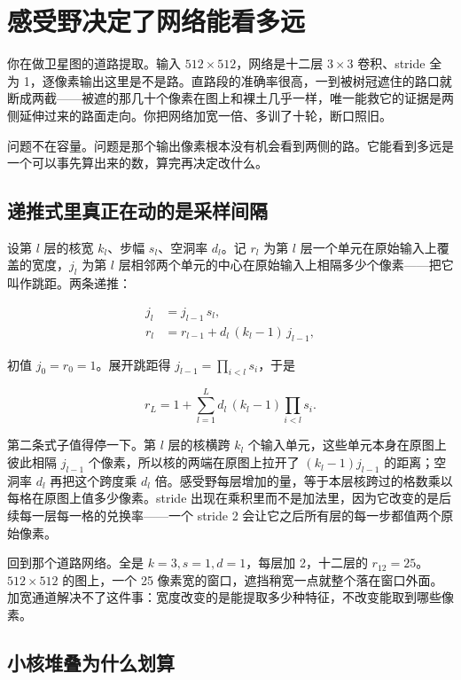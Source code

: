 \section{感受野决定了网络能看多远}
\label{sec:14-Deep-Learning/04-Convolutional-Networks/02}

你在做卫星图的道路提取。输入 \(512\times512\)，网络是十二层 \(3\times3\) 卷积、stride 全为 1，逐像素输出这里是不是路。直路段的准确率很高，一到被树冠遮住的路口就断成两截——被遮的那几十个像素在图上和裸土几乎一样，唯一能救它的证据是两侧延伸过来的路面走向。你把网络加宽一倍、多训了十轮，断口照旧。

问题不在容量。问题是那个输出像素根本没有机会看到两侧的路。它能看到多远是一个可以事先算出来的数，算完再决定改什么。

\subsection{递推式里真正在动的是采样间隔}

设第 \(l\) 层的核宽 \(k_l\)、步幅 \(s_l\)、空洞率 \(d_l\)。记 \(r_l\) 为第 \(l\) 层一个单元在原始输入上覆盖的宽度，\(j_l\) 为第 \(l\) 层相邻两个单元的中心在原始输入上相隔多少个像素——把它叫作跳距。两条递推：

\[
\begin{aligned}
j_l &= j_{l-1}\,s_l,\\
r_l &= r_{l-1} + d_l\,(k_l-1)\,j_{l-1},
\end{aligned}
\]

初值 \(j_0=r_0=1\)。展开跳距得 \(j_{l-1}=\prod_{i<l}s_i\)，于是

\[
r_L = 1 + \sum_{l=1}^{L} d_l\,(k_l-1)\prod_{i<l}s_i .
\]

第二条式子值得停一下。第 \(l\) 层的核横跨 \(k_l\) 个输入单元，这些单元本身在原图上彼此相隔 \(j_{l-1}\) 个像素，所以核的两端在原图上拉开了 \((k_l-1)j_{l-1}\) 的距离；空洞率 \(d_l\) 再把这个跨度乘 \(d_l\) 倍。感受野每层增加的量，等于本层核跨过的格数乘以每格在原图上值多少像素。stride 出现在乘积里而不是加法里，因为它改变的是后续每一层每一格的兑换率——一个 stride 2 会让它之后所有层的每一步都值两个原始像素。

回到那个道路网络。全是 \(k=3,s=1,d=1\)，每层加 2，十二层的 \(r_{12}=25\)。\(512\times512\) 的图上，一个 25 像素宽的窗口，遮挡稍宽一点就整个落在窗口外面。加宽通道解决不了这件事：宽度改变的是能提取多少种特征，不改变能取到哪些像素。

\subsection{小核堆叠为什么划算}

